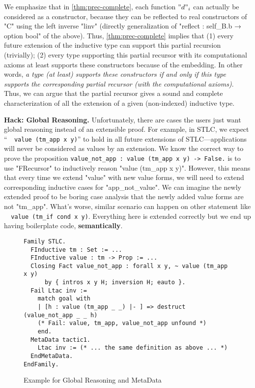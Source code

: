 We emphasize that in \cref{thm:prec-complete}, each function $"d"_i$ can
actually be considered as a constructor, because they can be reflected
to real constructors of "C" using the left inverse "linv" (directly generalization of "reflect : self_B.b → option bool" of the above). Thus, \cref{thm:prec-complete}
implies that (1) every future extension of the inductive type can
support this partial recursion (trivially); (2) every type supporting
this partial recursor with its computational axioms at least supports
these constructors because of the embedding. In other words, \textit{a
type (at least) supports these constructors if and only if this type
supports the corresponding partial recursor (with the computational
axioms)}.  Thus, we can argue that the partial recursor gives a sound and
complete characterization of all the extension of a given (non-indexed)
inductive type.


\textbf{Hack: Global Reasoning.}
Unfortunately, there are cases the users just want global reasoning
instead of an extensible proof. For example, in STLC, we expect
``\texttt{~ value (tm_app x y)}'' to hold in all future
extensions of STLC---applications will never be considered as values
by an extension.
We know the correct way to prove the proposition
\texttt{value_not_app : value (tm_app x y) -> False.} is to use
"FRecursor" to inductively reason "value (tm_app x y)". However, this
means that every time we extend "value" with new value forms, we will
need to extend corresponding inductive cases for "app_not_value". We can
imagine the newly extended proof to be boring case analysis that the
newly added value forms are not "tm_app". What's worse, similar
scenario can happen on other statement like \texttt{~ value
(tm_if cond x y)}. Everything here is extended correctly but we end up
having boilerplate code, \textbf{semantically}.
\begin{figure}[!htb]
\begin{verbatim}
Family STLC.
  FInductive tm : Set := ... 
  FInductive value : tm -> Prop := ... 
  Closing Fact value_not_app : forall x y, ~ value (tm_app x y) 
      by { intros x y H; inversion H; eauto }.
  Fail Ltac inv := 
    match goal with 
    | [h : value (tm_app _ _) |- ] => destruct (value_not_app _ _ h)
    (* Fail: value, tm_app, value_not_app unfound *)
    end. 
  MetaData tactic1.
    Ltac inv := (* ... the same definition as above ... *)
  EndMetaData.
EndFamily.
\end{verbatim}  
\caption{Example for Global Reasoning and MetaData}\label{fig:plugin-example-global-reasoning-meta-data}
\end{figure}


